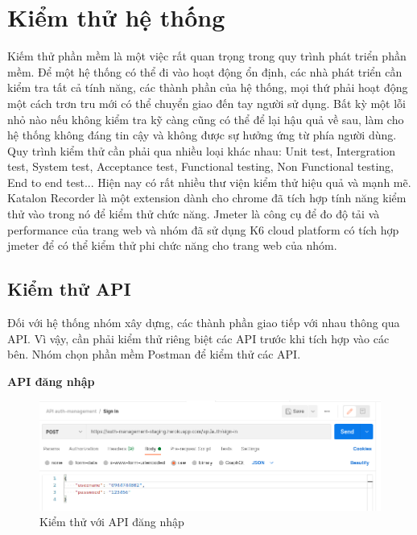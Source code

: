 \chapter{Kiểm thử hệ thống}\label{chap:testing}
		Kiếm thử phần mềm là một việc rất quan trọng trong quy trình phát triển phần mềm.
        Để một hệ thống có thể đi vào hoạt động ổn định, các nhà phát triển cần kiểm tra tất
        cả tính năng, các thành phần của hệ thống, mọi thứ phải hoạt động một cách trơn tru
        mới có thể chuyển giao đến tay người sử dụng. Bất kỳ một lỗi nhỏ nào nếu không kiểm
        tra kỹ càng cũng có thể để lại hậu quả về sau, làm cho hệ thống không đáng tin cậy và
        không được sự hưởng ứng từ phía người dùng.\\
        
        Quy trình kiểm thử cần phải qua nhiều loại khác nhau: Unit test, Intergration test, System test, Acceptance test, Functional testing, Non Functional testing, End to end test... Hiện nay có rất nhiều thư viện kiểm thử hiệu quả và mạnh mẽ. Katalon Recorder là một extension dành cho chrome đã tích hợp tính năng kiểm thử vào trong nó để kiểm thử chức năng. Jmeter là công cụ để đo độ tải và performance của trang web và nhóm đã sử dụng K6 cloud platform có tích hợp jmeter để có thể kiểm thử phi chức năng cho trang web của nhóm.
		\section{Kiểm thử API}
		Đối với hệ thống nhóm xây dựng, các thành phần giao tiếp với nhau thông qua API. Vì vậy, cần phải kiểm thử riêng biệt các API trước khi tích hợp vào các bên. Nhóm chọn phần mềm Postman để kiểm thử các API.\\
		
		\newpage
		
		\textbf{API đăng nhập}
		
		\begin{figure}[H]
			\includegraphics[width=1\textwidth]{Images/testing/API-sign-in.png}
			\centering
			\linebreak
			\caption{Kiểm thử với API đăng nhập}
		\end{figure}

